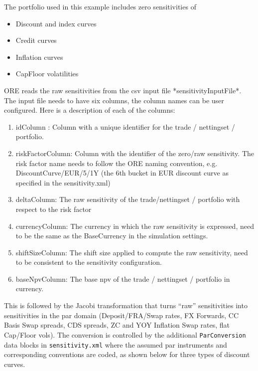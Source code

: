 The portfolio used in this example includes zero sensitivities of
\begin{itemize}
\item Discount and index curves
\item Credit curves
\item Inflation curves
\item CapFloor volatilities
\end{itemize}

ORE reads the raw sensitivities from the csv input file *sensitivityInputFile*. The input file needs to have six  columns, the column names can be user configured. Here is a description of each of the columns:

\begin{enumerate}
\item idColumn : Column with a unique identifier for the trade / nettingset / portfolio.
\item riskFactorColumn: Column with the identifier of the zero/raw sensitivity. The risk factor name needs to follow the ORE naming convention, e.g. DiscountCurve/EUR/5/1Y (the 6th bucket in EUR discount curve as specified in the sensitivity.xml)\
\item deltaColumn: The raw sensitivity of the trade/nettingset / portfolio with respect to the risk factor
\item currencyColumn: The currency in which the raw sensitivity is expressed, need to be the same as the BaseCurrency in the simulation settings.
\item shiftSizeColumn: The shift size applied to compute the raw sensitivity, need to be consistent to the sensitivity configuration.
\item baseNpvColumn: The base npv of the trade / nettingset / portfolio in currency.
\end{enumerate}

This is followed by the Jacobi transformation that turns ``raw'' sensitivities  into sensitivities in the par domain (Deposit/FRA/Swap rates, FX Forwards, CC Basis Swap spreads,
CDS spreads, ZC and YOY Inflation Swap rates, flat Cap/Floor vols). The conversion is controlled by the additional {\tt ParConversion} data blocks
in {\tt sensitivity.xml} where the assumed par instruments and corresponding conventions are coded, as shown below for three types of discount curves.


